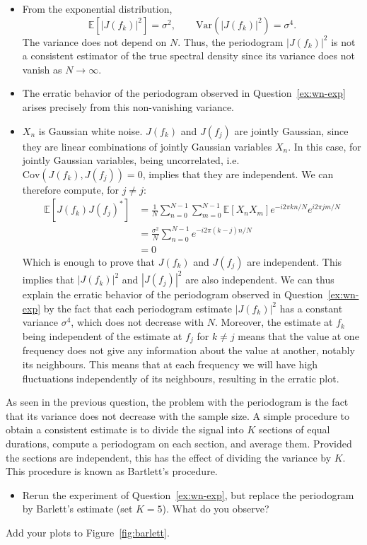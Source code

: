 \documentclass[11pt]{article}
\begin{document}
\begin{solution}
\begin{itemize}
\item From the exponential distribution,
\[
\mathbb{E}[|J(f_k)|^2] = \sigma^2, 
\qquad
\mathrm{Var}(|J(f_k)|^2) = \sigma^4.
\]
The variance does not depend on \(N\). Thus, the periodogram \( |J(f_k)|^2 \) is not a consistent estimator of the true spectral density since its variance does not vanish as \(N \to \infty\).

\item The erratic behavior of the periodogram observed in Question~\ref{ex:wn-exp} arises precisely from this non-vanishing variance.   
\item $X_n$ is Gaussian white noise. $J(f_k)$ and $J(f_j)$ are jointly Gaussian, since they are linear combinations of jointly Gaussian variables $X_n$. In this case, for jointly Gaussian variables, being uncorrelated, i.e. $\mathrm{Cov}(J(f_k), J(f_j)) = 0$, implies that they are independent. We can therefore compute, for $j \neq j$:
\[
\begin{aligned}
    \mathbb{E}[J(f_k) J(f_j)^*]
    &= \frac{1}{N} \sum_{n=0}^{N-1} \sum_{m=0}^{N-1} \mathbb{E}[X_n X_m] e^{-i 2\pi k n/N} e^{i 2\pi j m/N}\\
    &= \frac{\sigma^2}{N} \sum_{n=0}^{N-1} e^{-i 2\pi (k-j) n/N}\\
    &= 0
\end{aligned}
\]
Which is enough to prove that $J(f_k)$ and $J(f_j)$ are independent. This implies that $|J(f_k)|^2$ and $|J(f_j)|^2$ are also independent.
We can thus explain the erratic behavior of the periodogram observed in Question~\ref{ex:wn-exp} by the fact that each periodogram estimate $|J(f_k)|^2$ has a constant variance $\sigma^4$, which does not decrease with $N$.
Moreover, the estimate at $f_k$ being independent of the estimate at $f_j$ for $k \neq j$ means that the value at one frequency does not give any information about the value at another, notably its neighbours. This means that at each frequency we will have high fluctuations independently of its neighbours, resulting in the erratic plot. 
\end{itemize}
\end{solution}



\begin{exercise}\label{q:barlett}
    As seen in the previous question, the problem with the periodogram is the fact that its variance does not decrease with the sample size.
    A simple procedure to obtain a consistent estimate is to divide the signal into $K$ sections of equal durations, compute a periodogram on each section, and average them.
    Provided the sections are independent, this has the effect of dividing the variance by $K$. 
    This procedure is known as Bartlett's procedure.
    \begin{itemize}
        \item Rerun the experiment of Question~\ref{ex:wn-exp}, but replace the periodogram by Barlett's estimate (set $K=5$). What do you observe?
    \end{itemize}
    Add your plots to Figure~\ref{fig:barlett}.
\end{exercise}
\end{document}
